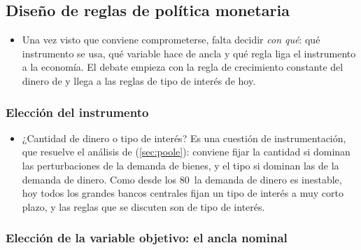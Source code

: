\documentclass[11pt]{article}
\begin{document}
\subsection{Diseño de reglas de política monetaria}\label{sec:reglas}

\begin{itemize}
\item Una vez visto que conviene comprometerse, falta decidir \emph{con qué}: qué instrumento se usa, qué variable hace de ancla y qué regla liga el instrumento a la economía. El debate empieza con la regla de crecimiento constante del dinero de \textcite{Friedman1960Program}  y llega a las reglas de tipo de interés de hoy.
\end{itemize}

\subsubsection{Elección del instrumento}\label{sec:instrumento-diseno}

\begin{itemize}
\item ¿Cantidad de dinero o tipo de interés? Es una cuestión de instrumentación, que resuelve el análisis de \textcite{Poole1970Optimal} (\ref{sec:poole}): conviene fijar la cantidad si dominan las perturbaciones de la demanda de bienes, y el tipo si dominan las de la demanda de dinero. Como desde los 80~la demanda de dinero es inestable, hoy todos los grandes bancos centrales fijan un tipo de interés a muy corto plazo, y las reglas que se discuten son de tipo de interés.
\end{itemize}

\subsubsection{Elección de la variable objetivo: el ancla nominal}\label{sec:variable-objetivo}
\end{document}
